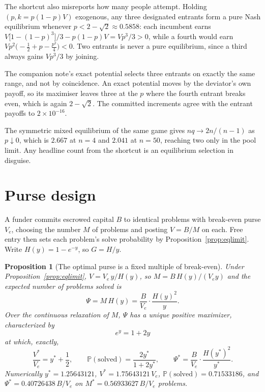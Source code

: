 \documentclass[11pt]{article}
\theoremstyle{itheads}
\newtheorem{proposition}{Proposition}
\newcommand{\PP}{\mathbb{P}}
\begin{document}
The shortcut also misreports how many people attempt. Holding
$(p,k=p(1-p)V)$ exogenous, any three designated entrants form a pure Nash
equilibrium whenever $p<2-\sqrt2\approx0.5858$: each incumbent earns
$V\big[1-(1-p)^{3}\big]/3-p(1-p)V=Vp^{3}/3>0$, while a fourth would earn
$Vp^{2}\big(-\tfrac12+p-\tfrac{p^{2}}{4}\big)<0$. Two entrants is never a
pure equilibrium, since a third always gains $Vp^{3}/3$ by joining.

The companion note's exact potential selects three entrants on exactly the
same range, and not by coincidence. An exact potential moves by the
deviator's own payoff, so its maximiser leaves three at the $p$ where the
fourth entrant breaks even, which is again $2-\sqrt2$. The committed
increments agree with the entrant payoffs to $2\times10^{-16}$.

The symmetric mixed equilibrium of the same game gives
$nq\to2n/(n-1)$ as $p\downarrow0$, which is $2.667$ at $n=4$ and $2.041$
at $n=50$, reaching two only in the pool limit. Any headline count from
the shortcut is an equilibrium selection in disguise.

\section{Purse design}
\label{sec:purse}

A funder commits escrowed capital $B$ to identical problems with
break-even purse $V_{e}$, choosing the number $M$ of problems and posting
$V=B/M$ on each. Free entry then sets each problem's solve probability by
Proposition~\ref{prop:eqlimit}. Write $H(y)=1-e^{-y}$, so $G=H/y$.

\begin{proposition}[The optimal purse is a fixed multiple of break-even]
\label{prop:purse}
Under Proposition~\ref{prop:eqlimit}, $V=V_{e}\,y/H(y)$, so
$M=B\,H(y)/(V_{e}y)$ and the expected number of problems solved is
\begin{equation}
\Psi=M\,H(y)=\frac{B}{V_{e}}\cdot\frac{H(y)^{2}}{y}.
\end{equation}
Over the continuous relaxation of $M$, $\Psi$ has a unique positive
maximizer, characterized by
\begin{equation}
\boxed{\;e^{y}=1+2y\;}
\end{equation}
at which, exactly,
\begin{equation}
\frac{V^{*}}{V_{e}}=y^{*}+\frac12,
\qquad
\PP(\text{solved})=\frac{2y^{*}}{1+2y^{*}},
\qquad
\Psi^{*}=\frac{B}{V_{e}}\cdot\frac{H(y^{*})^{2}}{y^{*}}.
\end{equation}
Numerically $y^{*}=1.25643121$, $V^{*}=1.75643121\,V_{e}$,
$\PP(\text{solved})=0.71533186$, and
$\Psi^{*}=0.40726438\,B/V_{e}$ on $M^{*}=0.56933627\,B/V_{e}$ problems.
\end{proposition}
\end{document}
